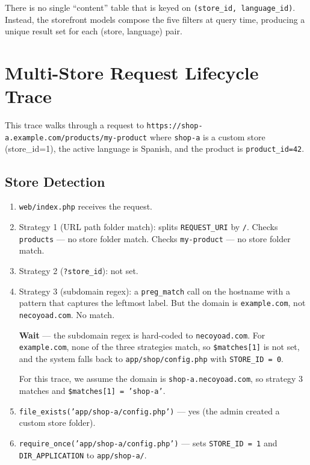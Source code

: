 \documentclass[11pt,a4paper]{article}
\begin{document}
There is no single ``content'' table that is keyed on
\texttt{(store\_id, language\_id)}. Instead, the storefront models
compose the five filters at query time, producing a unique result set
for each (store, language) pair.

\section{Multi-Store Request Lifecycle Trace}\label{sec:trace}

This trace walks through a request to
\texttt{https://shop-a.example.com/products/my-product} where
\texttt{shop-a} is a custom store (store\_id=1), the active language is
Spanish, and the product is \texttt{product\_id=42}.

\subsection{Store Detection}

\begin{enumerate}[leftmargin=1.6em,itemsep=2pt]
  \item \texttt{web/index.php} receives the request.
  \item Strategy 1 (URL path folder match): splits
        \texttt{REQUEST\_URI} by \texttt{/}. Checks
        \texttt{products} --- no store folder match. Checks
        \texttt{my-product} --- no store folder match.
  \item Strategy 2 (\texttt{?store\_id}): not set.
  \item Strategy 3 (subdomain regex): a \texttt{preg\_match} call on
        the hostname with a pattern that captures the leftmost label.
        But the domain is \texttt{example.com}, not
        \texttt{necoyoad.com}. No match.

        \textbf{Wait} --- the subdomain regex is hard-coded to
        \texttt{necoyoad.com}. For \texttt{example.com}, none of the
        three strategies match, so \texttt{\$matches[1]} is not set,
        and the system falls back to \texttt{app/shop/config.php}
        with \texttt{STORE\_ID = 0}.

        For this trace, we assume the domain is
        \texttt{shop-a.necoyoad.com}, so strategy 3 matches and
        \texttt{\$matches[1] = 'shop-a'}.
  \item \texttt{file\_exists('app/shop-a/config.php')} --- yes (the
        admin created a custom store folder).
  \item \texttt{require\_once('app/shop-a/config.php')} --- sets
        \texttt{STORE\_ID = 1} and \texttt{DIR\_APPLICATION} to
        \texttt{app/shop-a/}.
\end{enumerate}
\end{document}
